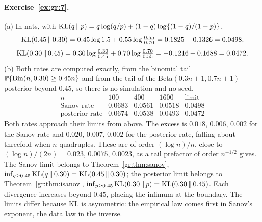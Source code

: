 \paragraph{Exercise~\ref{ex:gr:7}.} (a) In nats, with $\mathrm{KL}(q\,\|\,p)=q\log(q/p)+(1-q)\log\{(1-q)/(1-p)\}$,
\[
\mathrm{KL}(0.45\,\|\,0.30)=0.45\log1.5+0.55\log\tfrac{0.55}{0.70}=0.1825-0.1326=0.0498,
\]
\[
\mathrm{KL}(0.30\,\|\,0.45)=0.30\log\tfrac{0.30}{0.45}+0.70\log\tfrac{0.70}{0.55}=-0.1216+0.1688=0.0472.
\]
(b) Both rates are computed exactly, from the binomial tail $\mathbb{P}\{\mathrm{Bin}(n,0.30)\ge0.45n\}$ and from the tail of the Beta$(0.3n+1,0.7n+1)$ posterior beyond $0.45$, so there is no simulation and no seed.
\[
\begin{array}{lcccc}
n & 100 & 400 & 1600 & \text{limit}\\
\text{Sanov rate} & 0.0683 & 0.0561 & 0.0518 & 0.0498\\
\text{posterior rate} & 0.0674 & 0.0538 & 0.0493 & 0.0472
\end{array}
\]
Both rates approach their limits from above. The excess is $0.018$, $0.006$, $0.002$ for the Sanov rate and $0.020$, $0.007$, $0.002$ for the posterior rate, falling about threefold when $n$ quadruples. These are of order $(\log n)/n$, close to $(\log n)/(2n)=0.023$, $0.0075$, $0.0023$, as a tail prefactor of order $n^{-1/2}$ gives. The Sanov limit belongs to Theorem~\ref{gr:thm:sanov}, $\inf_{q\ge0.45}\mathrm{KL}(q\,\|\,0.30)=\mathrm{KL}(0.45\,\|\,0.30)$; the posterior limit belongs to Theorem~\ref{gr:thm:isanov}, $\inf_{p\ge0.45}\mathrm{KL}(0.30\,\|\,p)=\mathrm{KL}(0.30\,\|\,0.45)$. Each divergence increases beyond $0.45$, placing the infimum at the boundary. The limits differ because KL is asymmetric: the empirical law comes first in Sanov's exponent, the data law in the inverse.

